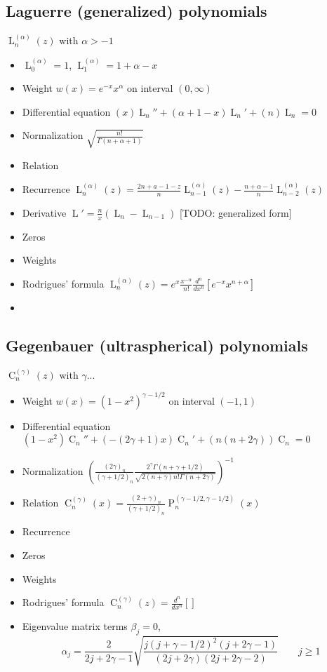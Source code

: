 \documentclass[10pt,dvipdfmx,letterpaper,twoside]{article}
\let\O=\operatorname
\let\al=\alpha
\let\gam=\gamma
\let\Gam=\Gamma
\begin{document}
\subsection{Laguerre (generalized) polynomials}
$\O{L}^{(\al)}_n(z)$ with $\al>-1$
\begin{itemize}
\item $\O{L}^{(\al)}_0 = 1$, $\O{L}^{(\al)}_1 = 1+\al-x$
\item Weight $w(x) = e^{-x} x^\al$ on interval $(0,\infty)$
\item Differential equation $\left(x\right) \O{L}_n'' + \left(\al+1-x\right) \O{L}_n' + \left(n\right) \O{L}_n = 0$
\item Normalization $\sqrt{\frac{n!}{\Gam(n+\al+1)}}$
\item Relation
\item Recurrence $\O{L}^{(\al)}_n(z) = \frac{2n+a-1-z}{n}\O{L}^{(\al)}_{n-1}(z) - \frac{n+\al-1}{n}\O{L}^{(\al)}_{n-2}(z)$
\item Derivative $\O{L}' = \frac{n}{x}\left(\O{L}_{n} - \O{L}_{n-1}\right)$ [TODO: generalized form]
\item Zeros
\item Weights
\item Rodrigues' formula $\O{L}^{(\al)}_n(z) = e^x \frac{x^{-\al}}{n!} \frac{d^n}{dx^n}\left[ e^{-x} x^{n+\al} \right]$
\item 
\end{itemize}

\subsection{Gegenbauer (ultraspherical) polynomials}
$\O{C}^{(\gam)}_n(z)$ with $\gam...$
\begin{itemize}
\item Weight $w(x) = (1-x^2)^{\gam-1/2}$ on interval $(-1,1)$
\item Differential equation $\left(1-x^2\right) \O{C}_n'' + \left(-(2\gam+1)x\right) \O{C}_n' + \left(n(n+2\gam)\right) \O{C}_n = 0$
\item Normalization $\left(\frac{(2\gam)_n}{(\gam+1/2)_n} \frac{2^\gam \Gam(n+\gam+1/2)}{\sqrt{2(n+\gam)n!\Gam(n+2\gam)}}\right)^{-1}$
\item Relation $\O{C}^{(\gam)}_n(x) = \frac{(2+\gam)_n}{(\gam+1/2)_n} \O{P}_n^{(\gam-1/2, \gam-1/2)}(x)$
\item Recurrence
\item Zeros
\item Weights
\item Rodrigues' formula $\O{C}^{(\gam)}_n(z) = \frac{d^n}{dx^n}\left[  \right]$
\item Eigenvalue matrix terms $\beta_j = 0$,
    \[ \al_j = \frac{2}{2j+2\gam-1} \sqrt{\frac{j(j+\gam-1/2)^2(j+2\gam-1)}{(2j+2\gam)(2j+2\gam-2)}} \qquad j\geq1 \]
\end{itemize}
\end{document}
